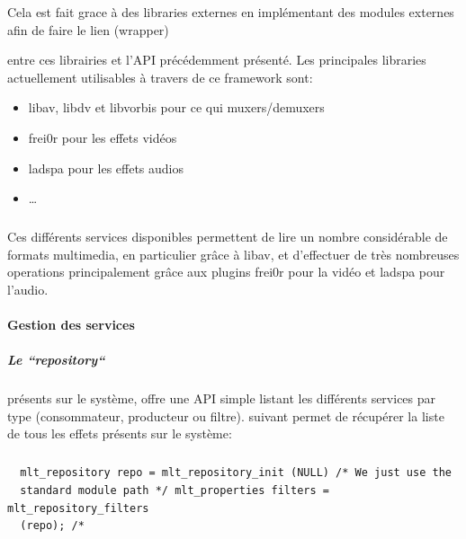 Cela est fait grace à des libraries externes en implémentant des modules
externes afin de faire le lien (wrapper)

 entre ces librairies et l'API précédemment
présenté. Les principales libraries actuellement utilisables à travers
de ce framework sont:

\begin{itemize}

  \item {libav, libdv et libvorbis pour ce qui %
  muxers/demuxers}

  \item {frei0r pour les effets vidéos}

  \item {ladspa pour les effets audios}

  \item {\ldots}

\end{itemize}

\subparagraph{}

Ces différents services disponibles permettent de lire un nombre
considérable de formats multimedia, en particulier grâce à libav,
et d'effectuer de très nombreuses operations principalement grâce aux
plugins frei0r pour la vidéo et ladspa pour l'audio.

\paragraph{Gestion des services}

\subparagraph{Le ``repository``}

présents sur le système, %
offre une API simple listant les différents services par type
(consommateur, producteur ou filtre).  %
suivant permet de récupérer la liste de tous les effets présents
sur le système:

\subparagraph{}

\begin{lstlisting}
  mlt_repository repo = mlt_repository_init (NULL) /* We just use the
  standard module path */ mlt_properties filters = mlt_repository_filters
  (repo); /*
\end{lstlisting}

